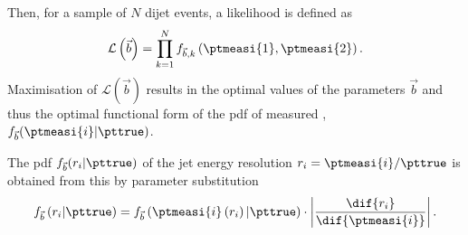 Then, for a sample of $N$ dijet events, a likelihood is defined as
\begin{equation}
  \label{eq:resFit:likelihood}
  \mathcal{L}\left(\vec{b}\right) = \prod^{N}_{k=1} f_{\vec{b},k}\left(\ptmeasi{1},\ptmeasi{2}\right).
\end{equation}
Maximisation of $\mathcal{L}(\vec{b})$ results in the optimal values of the parameters $\vec{b}$ and thus the optimal functional form of the pdf of measured \pt, $f_{\vec{b}}(\ptmeasi{i}|\pttrue)$.

The pdf $f_{\vec{b}}(r_{i}|\pttrue)$ of the jet energy resolution \mbox{$r_{i} = \ptmeasi{i} / \pttrue$} is obtained from this by parameter substitution
\begin{equation*}
  f_{\vec{b}}\left(r_{i}|\pttrue\right) =
  f_{\vec{b}}\left(\ptmeasi{i}\left(r_{i}\right)|\pttrue\right)\cdot\left|\frac{\dif{r_{i}}}{\dif{\ptmeasi{i}}}\right|.
\end{equation*}
